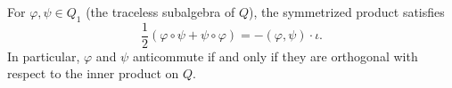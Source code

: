 For $\varphi, \psi \in Q_1$ (the traceless subalgebra of $Q$), the symmetrized product satisfies
$$
\frac{1}{2}(\varphi \circ \psi + \psi \circ \varphi) = -(\varphi, \psi) \cdot \iota.
$$
In particular, $\varphi$ and $\psi$ anticommute if and only if they are orthogonal with respect to the inner product on $Q$.
